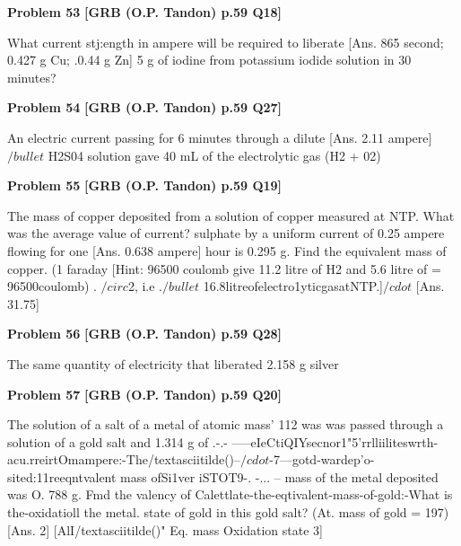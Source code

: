 \begin{problembox}
\textbf{Problem 53} \hfill \textbf{[GRB (O.P. Tandon) p.59 Q18]}
\label{q:ext-grb_all_questions-53}

What current stj:ength in ampere will be required to liberate 
[Ans. 865 second; 0.427 g Cu; .0.44 g Zn] 
5 g of iodine from potassium iodide solution in 30 minutes?
\end{problembox}

\begin{problembox}
\textbf{Problem 54} \hfill \textbf{[GRB (O.P. Tandon) p.59 Q27]}
\label{q:ext-grb_all_questions-54}

An electric current passing for 6 minutes through a dilute 
[Ans. 2.11 ampere] 
$/bullet$ 
H2S04 solution gave 40 mL of the electrolytic gas (H2 + 02)
\end{problembox}

\begin{problembox}
\textbf{Problem 55} \hfill \textbf{[GRB (O.P. Tandon) p.59 Q19]}
\label{q:ext-grb_all_questions-55}

The mass of copper deposited from a solution of copper 
measured at NTP. What was the average value of current? 
sulphate by a uniform current of 0.25 ampere flowing for one 
[Ans. 0.638 ampere] 
hour is 0.295 g. Find the equivalent mass of copper. (1 faraday 
[Hint: 96500 coulomb give 11.2 litre of H2 and 5.6 litre of 
= 96500coulomb) 
. 
$/circ$2, i.e .$/bullet$ 16.8litreofelectro1yticgasatNTP.]$/cdot$ 
[Ans. 31.75]
\end{problembox}

\begin{problembox}
\textbf{Problem 56} \hfill \textbf{[GRB (O.P. Tandon) p.59 Q28]}
\label{q:ext-grb_all_questions-56}

The same quantity of electricity that liberated 2.158 g silver
\end{problembox}

\begin{problembox}
\textbf{Problem 57} \hfill \textbf{[GRB (O.P. Tandon) p.59 Q20]}
\label{q:ext-grb_all_questions-57}

The solution of a salt of a metal of atomic mass' 112 was 
was passed through a solution of a gold salt and 1.314 g of 
.-.- -----eIeCtiQIYsecnor1"5'rrlliiliteswrth-acu.rreirtOmampere:-The/textasciitilde()--$/cdot$-7---gotd-wardep'o-sited:11reeqntvalent mass ofSi1ver iSTOT9-. -... --
mass of the metal deposited was O. 788 g. Fmd the valency of 
Calettlate-the-eqtivalent-mass-of-gold:-What is the-oxidatioll 
the metal. 
state of gold in this gold salt? (At. mass of gold = 197) 
[Ans. 2] 
[AlI/textasciitilde()" Eq. mass 
Oxidation state 
3]
\end{problembox}

